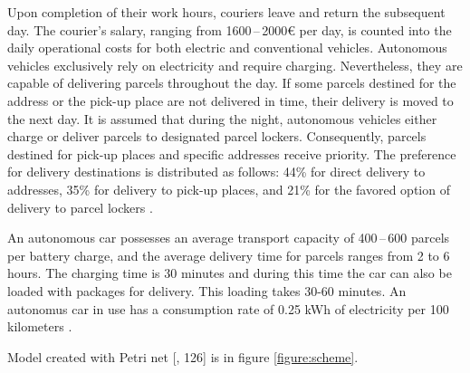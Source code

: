 \documentclass[a4paper, 11pt, a4paper]{article}
\begin{document}
Upon completion of their work hours, couriers leave and return the subsequent day. The courier's salary, ranging from 1600\,--\,2000€ per day, is counted into 
the daily operational costs for both electric and conventional vehicles. Autonomous vehicles exclusively rely on electricity and require charging. 
Nevertheless, they are capable of delivering parcels throughout the day. If some parcels destined for the address or the pick-up place are not delivered in time, their delivery is moved to the next day.
It is assumed that during the night, autonomous vehicles either 
charge or deliver parcels to designated parcel lockers. Consequently, parcels destined for pick-up places and specific addresses receive priority. 
The preference for delivery destinations is distributed as follows: 44\% for direct delivery to addresses, 35\% for delivery to pick-up places, 
and 21\% for the favored option of delivery to parcel lockers \cite{delivery.percentage}.

An autonomous car possesses an average transport capacity of 400\,--\,600 parcels per battery charge, and the average delivery time for parcels ranges 
from 2 to 6 hours. The charging time is 30 minutes and during this time the car can also be loaded with packages for delivery. This loading takes 30-60 
minutes. An autonomus car in use has a consumption rate of 0.25 kWh of electricity per 100 kilometers \cite{autonomous.emissions}.

Model created with Petri net [\cite{IMS.lectures}, 126] is in figure \ref{figure:scheme}.
\end{document}
